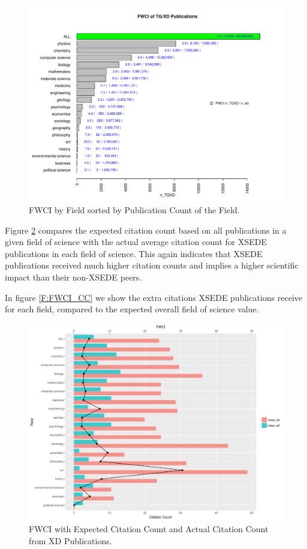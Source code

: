 \documentclass{sig-alternate}
\begin{document}
\begin{figure}[htb!]
    \includegraphics[width=0.95\columnwidth]{images/fwci_nxd.pdf}
    \caption{FWCI by Field sorted by Publication Count of the Field.}
    \label{F:fwci_nxd}
\end{figure}

Figure \ref{F:FWCIwCC} compares the expected citation count based on all publications in a given field of science with the actual average
citation count for XSEDE publications in each field of science. This again indicates that XSEDE publications received much
higher citation counts and implies a higher scientific impact than their non-XSEDE peers.

In figure \ref{F:FWCI_CC} we show the extra citations XSEDE publications receive for
each field, compared to the expected overall field of science value.

\begin{figure}[htb!]
    \includegraphics[width=0.95\columnwidth]{images/FWCIwCC.pdf}
    \caption{FWCI with Expected Citation Count and Actual Citation Count from XD Publications.}
    \label{F:FWCIwCC}
\end{figure}
\end{document}
